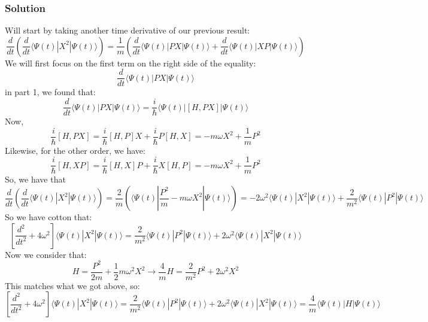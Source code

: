 \documentclass[12pt]{article}
\begin{document}
\subsubsection{Solution}
Will start by taking another time derivative of our previous result:
\begin{equation}
    \frac{d}{dt} \left(\frac{d}{dt} \langle \Psi(t)|X^2|\Psi(t)\rangle\right) = \frac{1}{m} \left(\frac{d}{dt}\langle \Psi(t)|PX|\Psi(t)\rangle+ \frac{d}{dt}\langle \Psi(t)|XP|\Psi(t)\rangle\right)
\end{equation}
We will first focus on the first term on the right side of the equality:
\begin{equation}
    \frac{d}{dt}\langle \Psi(t)|PX|\Psi(t)\rangle 
\end{equation}
in part 1, we found that:
\begin{equation}
    \frac{d}{dt}\langle \Psi(t)|PX|\Psi(t)\rangle = \frac{i}{\hbar}\langle \Psi(t)|[H, PX]|\Psi(t)\rangle
\end{equation}
Now,
\begin{equation}
   \frac{i}{\hbar} [H, PX] = \frac{i}{\hbar} [H, P]X + \frac{i}{\hbar} P[H, X] = -m\omega X^{2} +\frac{1}{m}P^{2}
\end{equation}
Likewise, for the other order, we have:
\begin{equation}
    \frac{i}{\hbar} [H, XP] = \frac{i}{\hbar} [H, X]P + \frac{i}{\hbar} X[H, P] = -m\omega X^{2} +\frac{1}{m}P^{2}
\end{equation}
So, we have that 
\begin{equation}
    \frac{d}{dt}\left(\frac{d}{dt} \langle \Psi(t)|X^2|\Psi(t)\rangle\right) = \frac{2}{m} \left(\langle\Psi (t)|\frac{P^{2}}{m}-m\omega X^{2}|\Psi (t)\rangle\right)= -2\omega ^{2} \langle\Psi (t)|X^{2}|\Psi (t)\rangle + \frac{2}{m^{2}} \langle\Psi (t)|P^{2}|\Psi (t)\rangle
\end{equation}
So we have cotton that:
\begin{equation}
    \left[ \frac{d^2}{dt^2} + 4\omega^2 \right]\langle \Psi(t)|X^2|\Psi(t)\rangle = \frac{2}{m^{2}} \langle\Psi (t)|P^{2}|\Psi (t)\rangle + 2\omega ^{2} \langle\Psi (t)|X^{2}|\Psi (t)\rangle
\end{equation}
Now we consider that:
\begin{equation}
    H = \frac{P^{2}}{2m} + \frac{1}{2}m\omega ^{2}X^{2} 
\rightarrow \frac{4}{m}H = \frac{2}{m^{2}}P^{2} + 2\omega ^{2}X^{2}
\end{equation}
This matches what we got above, so:
\begin{equation}
    \boxed{\left[ \frac{d^2}{dt^2} + 4\omega^2 \right]\langle \Psi(t)|X^2|\Psi(t)\rangle = \frac{2}{m^{2}} \langle\Psi (t)|P^{2}|\Psi (t)\rangle + 2\omega ^{2} \langle\Psi (t)|X^{2}|\Psi (t)\rangle = \frac{4}{m} \langle \Psi(t)|H|\Psi(t)\rangle}
    \end{equation}
\end{document}
